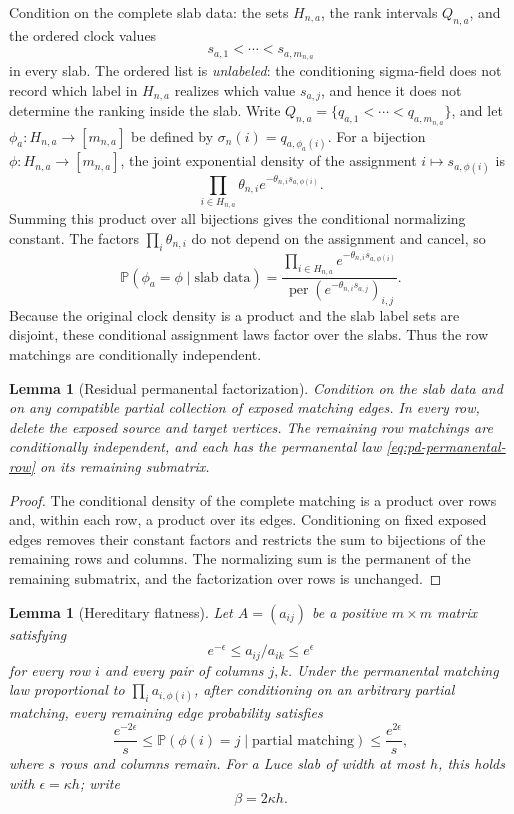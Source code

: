 \documentclass[11pt]{article}
\newtheorem{lemma}[theorem]{Lemma}
\theoremstyle{remark}
\newcommand{\Pp}{\mathbb P}
\begin{document}
Condition on the complete slab data: the sets $H_{n,a}$, the rank intervals
$Q_{n,a}$, and the ordered clock values
\[
        s_{a,1}<\cdots<s_{a,m_{n,a}}
\]
in every slab.  The ordered list is \emph{unlabeled}: the conditioning
sigma-field does not record which label in $H_{n,a}$ realizes which value
$s_{a,j}$, and hence it does not determine the ranking inside the slab.  Write
$Q_{n,a}=\{q_{a,1}<\cdots<q_{a,m_{n,a}}\}$, and let
$\phi_a:H_{n,a}\to[m_{n,a}]$ be defined by
$\sigma_n(i)=q_{a,\phi_a(i)}$.  For a bijection $\phi:H_{n,a}\to[m_{n,a}]$, the joint exponential density of
the assignment $i\mapsto s_{a,\phi(i)}$ is
\[
        \prod_{i\in H_{n,a}}
        \theta_{n,i}e^{-\theta_{n,i}s_{a,\phi(i)}}.
\]
Summing this product over all bijections gives the conditional normalizing
constant.  The factors $\prod_i\theta_{n,i}$ do not depend on the assignment
and cancel, so
\begin{equation}
 \Pp(\phi_a=\phi\mid\text{slab data})
 =\frac{\prod_{i\in H_{n,a}}e^{-\theta_{n,i}s_{a,\phi(i)}}}
 {\operatorname{per}(e^{-\theta_{n,i}s_{a,j}})_{i,j}}.
 \tag{6.3a}\label{eq:pd-permanental-row}
\end{equation}
Because the original clock density is a product and the slab label sets are
disjoint, these conditional assignment laws factor over the slabs.  Thus the
row matchings are conditionally independent.

\begin{lemma}[Residual permanental factorization]
\label{lem:pd-residual-factorization}
Condition on the slab data and on any compatible partial collection of exposed
matching edges.  In every row, delete the exposed source and target vertices.
The remaining row matchings are conditionally independent, and each has the
permanental law \eqref{eq:pd-permanental-row} on its remaining submatrix.
\end{lemma}

\begin{proof}
The conditional density of the complete matching is a product over rows and,
within each row, a product over its edges.  Conditioning on fixed exposed edges
removes their constant factors and restricts the sum to bijections of the
remaining rows and columns.  The normalizing sum is the permanent of the
remaining submatrix, and the factorization over rows is unchanged.
\end{proof}

\begin{lemma}[Hereditary flatness]
\label{lem:pd-hereditary-flatness}
Let $A=(a_{ij})$ be a positive $m\times m$ matrix satisfying
\[
        e^{-\epsilon}\le a_{ij}/a_{ik}\le e^\epsilon
\]
for every row $i$ and every pair of columns $j,k$.  Under the permanental
matching law proportional to $\prod_i a_{i,\phi(i)}$, after conditioning on an
arbitrary partial matching, every remaining edge probability satisfies
\[
 \frac{e^{-2\epsilon}}s
 \le\Pp(\phi(i)=j\mid\text{partial matching})
 \le\frac{e^{2\epsilon}}s,
\]
where $s$ rows and columns remain.  For a Luce slab of width at most $h$, this
holds with $\epsilon=\kappa h$; write
\[
        \beta=2\kappa h.
        \tag{6.4}
\]
\end{lemma}
\end{document}

